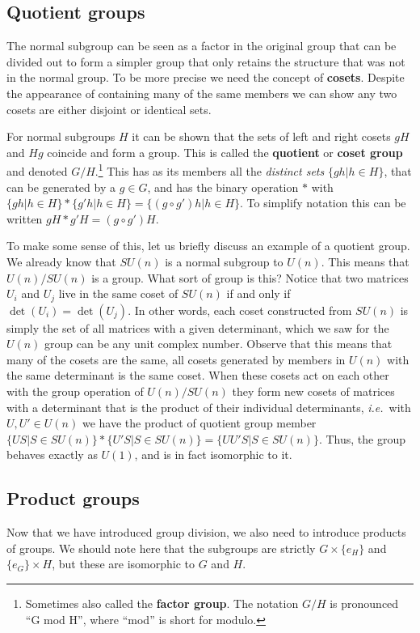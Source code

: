 \documentclass[notes.tex]{subfiles}
\begin{document}
\subsection{Quotient groups}
The normal subgroup can be seen as a factor in the original group that can be divided out to form a simpler group that only retains the structure that was not in the normal group. To be more precise we need the concept of {\bf cosets}. 
Despite the appearance of containing many of the same members we can show any two cosets are either disjoint or identical sets.

For normal subgroups $H$ it can be shown that the sets of left and right cosets $gH$ and $Hg$ coincide and form a group. This is called the {\bf quotient}  or {\bf coset group} and denoted $G/H$.\footnote{Sometimes also called the {\bf factor group}. The notation $G/H$ is pronounced ``G mod H'', where ``mod'' is short for modulo.}
This has as its members all the {\it distinct sets} $\{gh|h\in H\}$, that can be generated by a $g\in G$, and has the binary operation $*$ with $\{gh|h\in H\}*\{g'h|h\in H\}=\{ (g\circ g')h| h\in H\}$. To simplify notation this can be written $gH*g'H=(g\circ g') H$. 
 
To make some sense of this, let us briefly discuss an example of a quotient group. We already know that $SU(n)$ is a normal subgroup to $U(n)$. This means that $U(n)/SU(n)$ is a group. What sort of group is this? Notice that two matrices $U_i$ and $U_j$ live in the same coset of $SU(n)$ if and only if $\det(U_i)=\det(U_j)$. In other words, each coset constructed from $SU(n)$ is simply the set of all matrices with a given determinant, which we saw for the $U(n)$ group can be any unit complex number. Observe that this means that many of the cosets are the same, all cosets generated by members in $U(n)$ with the same determinant is the same coset. 
When these cosets act on each other with the group operation of $U(n)/SU(n)$ they form new cosets of matrices with a determinant that is the product of their individual determinants, {\it i.e.}\ with $U,U'\in U(n)$ we have the product of quotient group member $\{US|S\in SU(n)\}*\{U'S| S\in SU(n)\}=\{ UU'S| S\in SU(n)\}$. Thus, the group behaves exactly as $U(1)$, and is in fact isomorphic to it.

\subsection{Product groups}
Now that we have introduced group division,  we also need to introduce products of groups. 
We should note here that the subgroups are strictly $G\times\{e_H\}$ and $\{e_G\}\times H$, but these are isomorphic to $G$ and $H$.
\end{document}
